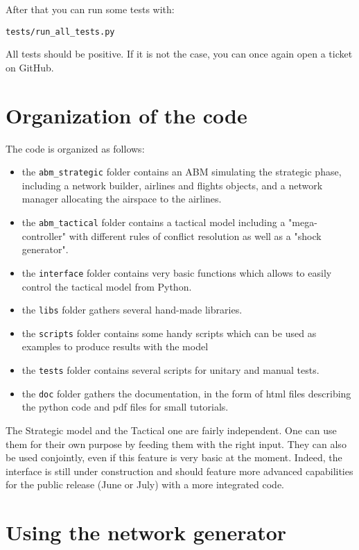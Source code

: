 \documentclass[12pt]{article}
\begin{document}
After that you can run some tests with:
\begin{verbatim}
tests/run_all_tests.py
\end{verbatim}

All tests should be positive. If it is not the case, you can once again open a ticket on GitHub.

\section{Organization of the code}

The code is organized as follows:
\begin{itemize}
\item the \verb|abm_strategic| folder contains an ABM simulating the strategic phase, including a network builder, airlines and flights objects, and a network manager allocating the airspace to the airlines. 
\item the \verb|abm_tactical| folder contains a tactical model including a "mega-controller" with different rules of conflict resolution as well as a "shock generator".
\item the \verb|interface| folder contains very basic functions which allows to easily control the tactical model from Python.
\item the \verb|libs| folder gathers several hand-made libraries.
\item the \verb|scripts| folder contains some handy scripts which can be used as examples to produce results with the model
\item the \verb|tests| folder contains several scripts for unitary and manual tests. 
\item the \verb|doc| folder gathers the documentation, in the form of html files describing the python code and pdf files for small tutorials.
\end{itemize}          

The Strategic model and the Tactical one are fairly independent. One can use them for their own purpose by feeding them with the right input. They can also be used conjointly, even if this feature is very basic at the moment. Indeed, the interface is still under construction and should feature more advanced capabilities for the public release (June or July) with a more integrated code.

\section{Using the network generator}
\label{sec:network}
\end{document}
